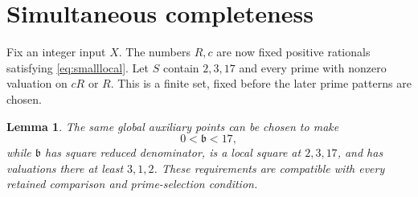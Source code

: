 \documentclass[11pt,a4paper]{article}
\newtheorem{lemma}[theorem]{Lemma}
\theoremstyle{definition}\newtheorem{definition}[theorem]{Definition}
\theoremstyle{remark}\newtheorem{remark}[theorem]{Remark}
\begin{document}
\section{Simultaneous completeness}\label{sec:complete}
Fix an integer input $X$. The numbers $R,c$ are now fixed positive
rationals satisfying \eqref{eq:smalllocal}. Let $S$ contain
$2,3,17$ and every prime with nonzero valuation on $cR$ or $R$.
This is a finite set, fixed before the later prime patterns are chosen.

\begin{lemma}\label{lem:prepare}
The same global auxiliary points can be chosen to make
\[
        0<\mathfrak b<17,
\]
while $\mathfrak b$ has square reduced denominator, is a local square
at $2,3,17$, and has valuations there at least $3,1,2$.
These requirements are compatible with every retained comparison and
prime-selection condition.
\end{lemma}
\end{document}
